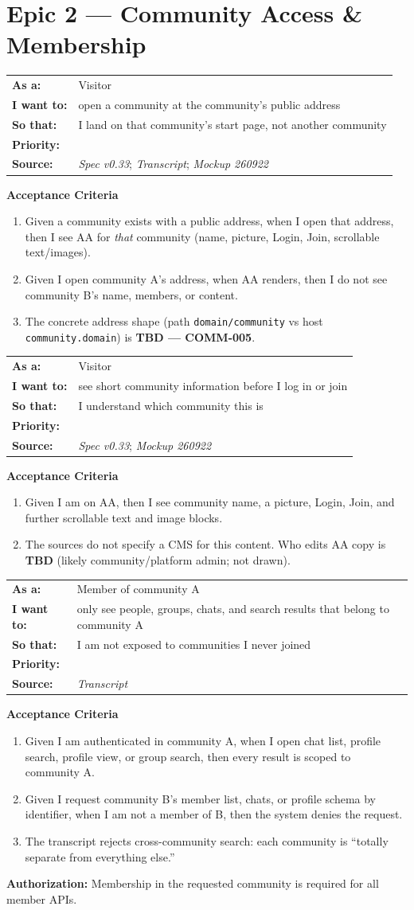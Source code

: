 \documentclass[11pt,a4paper]{article}
\makeatletter
\newcommand{\priPzero}{\colorbox{p0}{\makebox[4.6em]{\textcolor{white}{\scriptsize\bfseries P0 V1}}}}
\newcommand{\srcSpec}{\textit{Spec v0.33}}
\newcommand{\srcTx}{\textit{Transcript}}
\newcommand{\srcMock}{\textit{Mockup 260922}}
\newenvironment{story}[1]{%
  \Needspace{10\baselineskip}%
  \vspace{0.7em}%
  \noindent
  \colorbox{navy}{\makebox[\dimexpr\textwidth-2\fboxsep\relax][l]{\textcolor{white}{\bfseries\ #1}}}%
  \par\vspace{0.35em}%
}{\par\vspace{0.55em}}
\newcommand{\storymeta}[5]{%
  \noindent
  \begin{tabularx}{\textwidth}{@{}>{\bfseries}l X@{}}
    As a: & #1 \\
    I want to: & #2 \\
    So that: & #3 \\
    Priority: & #4 \\
    Source: & #5 \\
  \end{tabularx}
  \par\vspace{0.3em}
}
\newcommand{\achead}{\noindent\textbf{Acceptance Criteria}\par}
\newcommand{\authz}[1]{\noindent\textbf{Authorization:} #1\par}
\makeatother
\begin{document}
\section{Epic 2 --- Community Access \& Membership}

\begin{story}{COMM-001 --- Open a community by URL}
\storymeta{Visitor}{open a community at the community's public address}{I land on that community's start page, not another community}{\priPzero}{\srcSpec; \srcTx; \srcMock}
\achead
\begin{enumerate}
  \item Given a community exists with a public address, when I open that address, then I see AA for \emph{that} community (name, picture, Login, Join, scrollable text/images).
  \item Given I open community A's address, when AA renders, then I do not see community B's name, members, or content.
  \item The concrete address shape (path \texttt{domain/community} vs host \texttt{community.domain}) is \textbf{TBD --- COMM-005}.
\end{enumerate}
\end{story}

\begin{story}{COMM-002 --- Community start page content}
\storymeta{Visitor}{see short community information before I log in or join}{I understand which community this is}{\priPzero}{\srcSpec; \srcMock}
\achead
\begin{enumerate}
  \item Given I am on AA, then I see community name, a picture, Login, Join, and further scrollable text and image blocks.
  \item The sources do not specify a CMS for this content. Who edits AA copy is \textbf{TBD} (likely community/platform admin; not drawn).
\end{enumerate}
\end{story}

\begin{story}{COMM-003 --- Community isolation (hard boundary)}
\storymeta{Member of community A}{only see people, groups, chats, and search results that belong to community A}{I am not exposed to communities I never joined}{\priPzero}{\srcTx}
\achead
\begin{enumerate}
  \item Given I am authenticated in community A, when I open chat list, profile search, profile view, or group search, then every result is scoped to community A.
  \item Given I request community B's member list, chats, or profile schema by identifier, when I am not a member of B, then the system denies the request.
  \item The transcript rejects cross-community search: each community is ``totally separate from everything else.''
\end{enumerate}
\authz{Membership in the requested community is required for all member APIs.}
\end{story}
\end{document}
